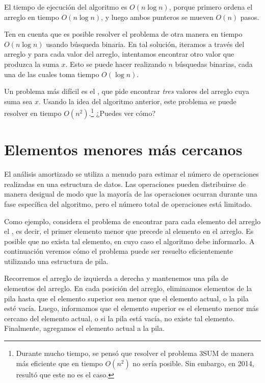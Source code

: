 El tiempo de ejecución del algoritmo es
$O(n \log n)$, porque primero ordena
el arreglo en tiempo $O(n \log n)$,
y luego ambos punteros se mueven $O(n)$ pasos.

Ten en cuenta que es posible resolver el problema
de otra manera en tiempo $O(n \log n)$ usando búsqueda binaria.
En tal solución, iteramos a través del arreglo
y para cada valor del arreglo, intentamos encontrar otro
valor que produzca la suma $x$.
Esto se puede hacer realizando $n$ búsquedas binarias,
cada una de las cuales toma tiempo $O(\log n)$.

Un problema más difícil es
el , que pide
encontrar \emph{tres} valores del arreglo
cuya suma sea $x$.
Usando la idea del algoritmo anterior,
este problema se puede resolver en tiempo $O(n^2)$.\footnote{Durante mucho tiempo,
    se pensó que resolver
    el problema 3SUM de manera más eficiente que en tiempo $O(n^2)$
    no sería posible.
    Sin embargo, en 2014, resultó \cite{gro14}
    que este no es el caso.}
¿Puedes ver cómo?

\section{Elementos menores más cercanos}


El análisis amortizado se utiliza a menudo para
estimar el número de operaciones
realizadas en una estructura de datos.
Las operaciones pueden distribuirse de manera desigual de modo que
la mayoría de las operaciones ocurran durante una
fase específica del algoritmo, pero el número total
de operaciones está limitado.

Como ejemplo, considera el problema
de encontrar para cada elemento del arreglo
el , es decir,
el primer elemento menor que precede al elemento
en el arreglo.
Es posible que no exista tal elemento,
en cuyo caso el algoritmo debe informarlo.
A continuación veremos cómo el problema puede ser
resuelto eficientemente utilizando una estructura de pila.

Recorremos el arreglo de izquierda a derecha
y mantenemos una pila de elementos del arreglo.
En cada posición del arreglo, eliminamos elementos de la pila
hasta que el elemento superior sea menor que el
elemento actual, o la pila esté vacía.
Luego, informamos que el elemento superior es
el elemento menor más cercano del elemento actual,
o si la pila está vacía, no existe tal elemento.
Finalmente, agregamos el elemento actual a la pila.

